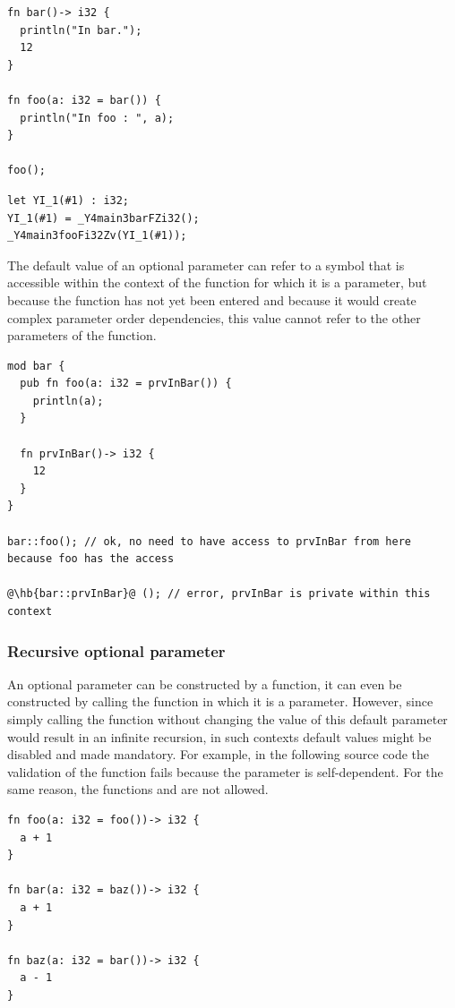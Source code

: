 \begin{lstlisting}[style=coloredverbatim]
fn bar()-> i32 {
  println("In bar.");
  12
}

fn foo(a: i32 = bar()) {
  println("In foo : ", a);
}

foo();
\end{lstlisting}

\begin{lstlisting}[style=lyilVerb]
let YI_1(#1) : i32;
YI_1(#1) = _Y4main3barFZi32();
_Y4main3fooFi32Zv(YI_1(#1));
\end{lstlisting}

The default value of an optional parameter can refer to a symbol that is
accessible within the context of the function for which it is a parameter, but
because the function has not yet been entered and because it would create
complex parameter order dependencies, this value cannot refer to the other
parameters of the function.

\begin{lstlisting}[style=coloredverbatimError, escapechar=@]
mod bar {
  pub fn foo(a: i32 = prvInBar()) {
    println(a);
  }

  fn prvInBar()-> i32 {
    12
  }
}

bar::foo(); // ok, no need to have access to prvInBar from here because foo has the access

@\hb{bar::prvInBar}@ (); // error, prvInBar is private within this context
\end{lstlisting}

\subsubsection*{Recursive optional parameter}

An optional parameter can be constructed by a function, it can even be
constructed by calling the function in which it is a parameter. However, since
simply calling the function without changing the value of this default parameter
would result in an infinite recursion, in such contexts default values might be
disabled and made mandatory. For example, in the following source code the
validation of the function  fails because the parameter 
is self-dependent. For the same reason, the functions  and
 are not allowed.

\begin{lstlisting}[style=coloredverbatim]
fn foo(a: i32 = foo())-> i32 {
  a + 1
}

fn bar(a: i32 = baz())-> i32 {
  a + 1
}

fn baz(a: i32 = bar())-> i32 {
  a - 1
}
\end{lstlisting}

